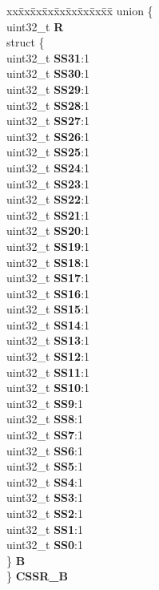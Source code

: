 \begin{DoxyCompactItemize}
\begin{tabbing}
\end{tabbing}\item 
\mbox{\label{structETPU__tag_a810667f958aa9ad31a450a697d8362ee}} 
\begin{tabbing}
xx\=xx\=xx\=xx\=xx\=xx\=xx\=xx\=xx\=\kill
union \{\\
\>uint32\_t {\bfseries R}\\
\>struct \{\\
\>\>uint32\_t {\bfseries SS31}:1\\
\>\>uint32\_t {\bfseries SS30}:1\\
\>\>uint32\_t {\bfseries SS29}:1\\
\>\>uint32\_t {\bfseries SS28}:1\\
\>\>uint32\_t {\bfseries SS27}:1\\
\>\>uint32\_t {\bfseries SS26}:1\\
\>\>uint32\_t {\bfseries SS25}:1\\
\>\>uint32\_t {\bfseries SS24}:1\\
\>\>uint32\_t {\bfseries SS23}:1\\
\>\>uint32\_t {\bfseries SS22}:1\\
\>\>uint32\_t {\bfseries SS21}:1\\
\>\>uint32\_t {\bfseries SS20}:1\\
\>\>uint32\_t {\bfseries SS19}:1\\
\>\>uint32\_t {\bfseries SS18}:1\\
\>\>uint32\_t {\bfseries SS17}:1\\
\>\>uint32\_t {\bfseries SS16}:1\\
\>\>uint32\_t {\bfseries SS15}:1\\
\>\>uint32\_t {\bfseries SS14}:1\\
\>\>uint32\_t {\bfseries SS13}:1\\
\>\>uint32\_t {\bfseries SS12}:1\\
\>\>uint32\_t {\bfseries SS11}:1\\
\>\>uint32\_t {\bfseries SS10}:1\\
\>\>uint32\_t {\bfseries SS9}:1\\
\>\>uint32\_t {\bfseries SS8}:1\\
\>\>uint32\_t {\bfseries SS7}:1\\
\>\>uint32\_t {\bfseries SS6}:1\\
\>\>uint32\_t {\bfseries SS5}:1\\
\>\>uint32\_t {\bfseries SS4}:1\\
\>\>uint32\_t {\bfseries SS3}:1\\
\>\>uint32\_t {\bfseries SS2}:1\\
\>\>uint32\_t {\bfseries SS1}:1\\
\>\>uint32\_t {\bfseries SS0}:1\\
\>\} {\bfseries B}\\
\} {\bfseries CSSR\_B}\\


\end{tabbing}
\end{DoxyCompactItemize}
